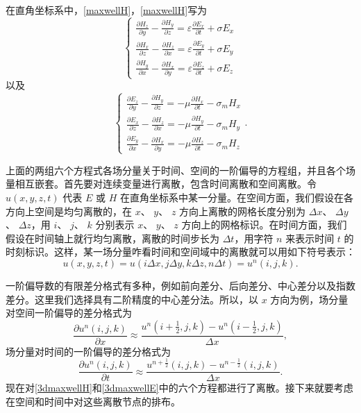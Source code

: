 在直角坐标系中，\eqref{maxwellH}，\eqref{maxwellH}写为
\begin{equation}\label{3dmaxwellE}
\begin{cases}
\frac{\partial H_z}{\partial y}-\frac{\partial H_y}{\partial z}=\varepsilon\frac{\partial E_x}{\partial t}+\sigma E_x\\
\frac{\partial H_x}{\partial z}-\frac{\partial H_z}{\partial x}=\varepsilon\frac{\partial E_y}{\partial t}+\sigma E_y\\
\frac{\partial H_y}{\partial x}-\frac{\partial H_x}{\partial y}=\varepsilon\frac{\partial E_z}{\partial t}+\sigma E_z
\end{cases}
\end{equation}
以及
\begin{equation}\label{3dmaxwellH}
\begin{cases}
\frac{\partial E_z}{\partial y}-\frac{\partial H_y}{\partial z}=-\mu\frac{\partial H_x}{\partial t}-\sigma_m H_x\\
\frac{\partial E_x}{\partial z}-\frac{\partial H_z}{\partial x}=-\mu\frac{\partial H_y}{\partial t}-\sigma_m H_y\\
\frac{\partial E_y}{\partial x}-\frac{\partial H_x}{\partial y}=-\mu\frac{\partial H_z}{\partial t}-\sigma_m H_z
\end{cases}.
\end{equation}

上面的两组六个方程式各场分量关于时间、空间的一阶偏导的方程组，并且各个场量相互嵌套。首先要对连续变量进行离散，包含时间离散和空间离散。令 $u(x,y,z,t)$ 代表 $\mathbf{\mathit{E}}$ 或 $\mathbf{\mathit{H}}$ 在直角坐标系中某一分量。在空间方面，我们假设在各方向上空间是均匀离散的，在 $x$、 $y$、 $z$ 方向上离散的网格长度分别为 $\Delta x$、 $\Delta y$、 $\Delta z$，用 $i$、 $j$、 $k$ 分别表示 $x$、 $y$、 $z$ 方向上的网格标识。在时间方面，我们假设在时间轴上就行均匀离散，离散的时间步长为 $\Delta t$，用字符 $n$ 来表示时间 $t$ 的时刻标识。这样，某一场分量咋看时间和空间域中的离散就可以用如下符号表示：
\begin{equation}
u(x,y,z,t)=u(i\Delta x,j\Delta y,k\Delta z,n\Delta t)=u^n(i,j,k).
\end{equation}

一阶偏导数的有限差分格式有多种，例如前向差分、后向差分、中心差分以及指数差分。这里我们选择具有二阶精度的中心差分法。所以，以 $x$ 方向为例，场分量对空间一阶偏导的差分格式为
\begin{equation}\label{space discrete}
\frac{\partial u^n(i,j,k)}{\partial x} \approx \frac{
	u^n(i+\frac{1}{2},j,k)-u^n(i-\frac{1}{2},j,k)
	}{\Delta x},
\end{equation}
场分量对时间的一阶偏导的差分格式为
\begin{equation}\label{time discrete}
\frac{\partial u^n(i,j,k)}{\partial t} \approx \frac{
	u^{n+\frac{1}{2}}(i,j,k)-u^{n-\frac{1}{2}}(i,j,k)
}{\Delta x}.
\end{equation}
现在对\eqref{3dmaxwellH}和\eqref{3dmaxwellE}中的六个方程都进行了离散。接下来就要考虑在空间和时间中对这些离散节点的排布。

